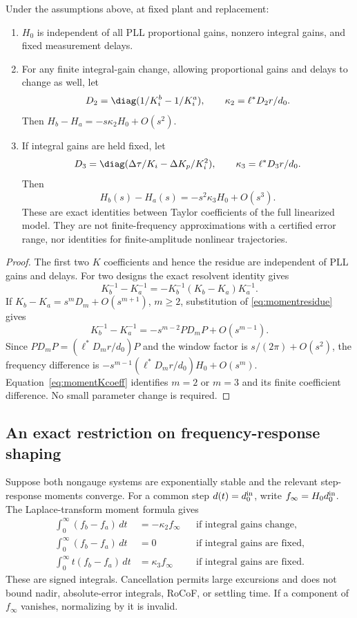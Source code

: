 \begin{theorem}
\label{thm:momentlaw}
Under the assumptions above, at fixed plant and replacement:
\begin{enumerate}
\item $H_0$ is independent of all PLL proportional gains, nonzero integral
gains, and fixed measurement delays.
\item For any finite integral-gain change, allowing proportional gains and
delays to change as well, let
\[
 D_2=\diag(1/K_i^{b}-1/K_i^{a}),\qquad
 \kappa_2=\ell^*D_2r/d_0.
\]
Then $H_b-H_a=-s\kappa_2H_0+O(s^2)$.
\item If integral gains are held fixed, let
\[
 D_3=\diag(\Delta\tau/K_i-\Delta K_p/K_i^2),\qquad
 \kappa_3=\ell^*D_3r/d_0.
\]
Then
\begin{equation}
 \boxed{H_b(s)-H_a(s)=-s^2\kappa_3H_0+O(s^3).}
 \label{eq:momentlaw}
\end{equation}
These are exact identities between Taylor coefficients of the full linearized
model. They are not finite-frequency approximations with a certified error
range, nor identities for finite-amplitude nonlinear trajectories.
\end{enumerate}
\end{theorem}
\begin{proof}
The first two $K$ coefficients and hence the residue are independent of PLL
gains and delays. For two designs the exact resolvent identity gives
\[
 K_b^{-1}-K_a^{-1}=-K_b^{-1}(K_b-K_a)K_a^{-1}.
\]
If $K_b-K_a=s^mD_m+O(s^{m+1})$, $m\ge2$, substitution of
\eqref{eq:momentresidue} gives
\[
 K_b^{-1}-K_a^{-1}=-s^{m-2}PD_mP+O(s^{m-1}).
\]
Since $PD_mP=(\ell^*D_mr/d_0)P$ and the window factor is
$s/(2\pi)+O(s^2)$, the frequency difference is
$-s^{m-1}(\ell^*D_mr/d_0)H_0+O(s^m)$.
Equation~\eqref{eq:momentKcoeff} identifies $m=2$ or $m=3$ and its finite
coefficient difference. No small parameter change is required.
\end{proof}

\subsection{An exact restriction on frequency-response shaping}
Suppose both nongauge systems are exponentially stable and the relevant
step-response moments converge. For a common step $d(t)=d_0^{\rm in}$,
write $f_\infty=H_0d_0^{\rm in}$. The Laplace-transform moment formula gives
\begin{align}
 \int_0^\infty(f_b-f_a)\,dt&=-\kappa_2f_\infty
       &&\text{if integral gains change},\label{eq:arealaw}\\
 \int_0^\infty(f_b-f_a)\,dt&=0
       &&\text{if integral gains are fixed},\\
 \int_0^\infty t(f_b-f_a)\,dt&=\kappa_3f_\infty
       &&\text{if integral gains are fixed}.\label{eq:firstmomentlaw}
\end{align}
These are signed integrals. Cancellation permits large excursions and does
not bound nadir, absolute-error integrals, RoCoF, or settling time.
If a component of $f_\infty$ vanishes, normalizing by it is invalid.

